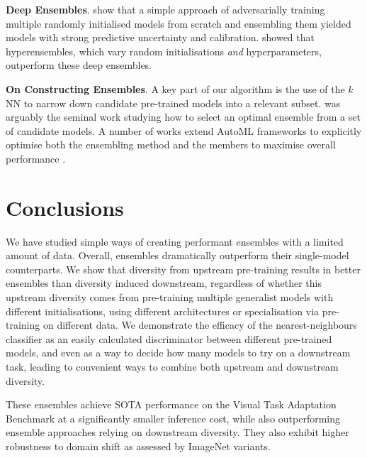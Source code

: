 \documentclass{article} \usepackage{iclr2021_conference,times}
\begin{document}
\textbf{Deep Ensembles}.
\citet{balaji2017ensembles} show that a simple approach of adversarially training multiple randomly initialised models from scratch and ensembling them yielded models with strong predictive uncertainty and calibration. \citet{wenzel2020hyperparameter} showed that hyperensembles, which vary random initialisations \emph{and} hyperparameters, outperform these deep ensembles. 

\textbf{On Constructing Ensembles}.
A key part of our algorithm is the use of the $k$NN to narrow down candidate pre-trained models into a relevant subset. 
\citet{caruana2004ensembleselection} was arguably the seminal work studying how to select an optimal ensemble from a set of candidate models.
A number of works extend AutoML frameworks \citep{he2019automl} to explicitly optimise both the ensembling method and the members to maximise overall performance \citep{wistuba2017frankenstein, xavier2018ea}.

%
 

\vspace{-0.5em}
\section{Conclusions}
We have studied simple ways of creating performant ensembles with a limited amount of data.
Overall, ensembles dramatically outperform their single-model counterparts.
We show that diversity from upstream pre-training results in better ensembles than diversity induced downstream, regardless of whether this upstream diversity comes from pre-training multiple generalist models with different initialisations, using different architectures or specialisation via pre-training on different data. We demonstrate the efficacy of the nearest-neighbours classifier as an easily calculated discriminator between different pre-trained models, and even as a way to decide how many models to try on a downstream task, leading to convenient ways to combine both upstream and downstream diversity.

These ensembles achieve SOTA performance on the Visual Task Adaptation Benchmark at a significantly smaller inference cost, while also outperforming ensemble approaches relying on downstream diversity. They also exhibit higher robustness to domain shift as assessed by ImageNet variants.
\end{document}
